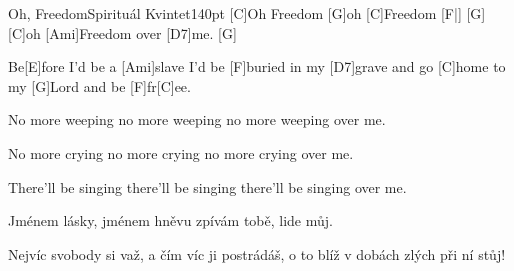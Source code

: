 \begin{song}{Oh, Freedom}{Spirituál Kvintet}{140pt}
%
[C]Oh Freedom [G]oh [C]Freedom [F|]{} [G]{}
[C]oh [Ami]Freedom over [D7]me. [G]{}

\chorus%
Be[E]fore I'd be a [Ami]slave
I'd be [F]buried in my [D7]grave
and go [C]home to my [G]Lord
and be [F]fr[C]ee.

%
No more weeping no more weeping
no more weeping over me.
\repchor

%
No more crying no more crying
no more crying over me.
\repchor

%
There'll be singing there'll be singing
there'll be singing over me.
\repchor

%
Jménem lásky, jménem hněvu
zpívám tobě, lide můj.

\chorus%
Nejvíc svobody si važ,
a čím víc ji postrádáš,
o to blíž v dobách zlých
při ní stůj!
\end{song}
